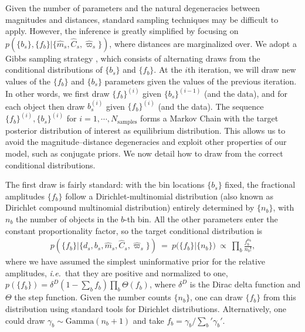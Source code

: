 \documentclass[manuscript, letterpaper]{aastex6}
\newcommand{\ie}{{\textit{i.e.}~}}
\newcommand{\eg}{{\textit{e.g.},~}}
\newcommand{\eqn}[1]{\begin{eqnarray}#1\end{eqnarray}}
\begin{document}
Given the number of parameters and the natural degeneracies between magnitudes and distances, standard sampling techniques may be difficult to apply.
However, the inference is greatly simplified by focusing on $p(\{ b_s \}, \{ f_{b} \} | \{ \hat{m}_s, \hat{C}_s, \hat{\varpi}_s \})$, where distances are marginalized over.
We adopt a Gibbs sampling strategy \citep[see \eg][]{Casella1992, Wandelt2004, Levin2009, brooks2011handbook}, which consists of alternating draws from the conditional distributions of $\{ b_s \}$ and $\{ f_{b} \}$.
At the $i$th iteration, we will draw new values of the $\{ f_{b} \}$ and $\{b_s\}$ parameters given the values of the previous iteration.
In other words, we first draw $\{ f_{b} \}^{(i)}$ given $\{b_s\}^{(i-1)}$ (and the data), and for each object then draw $b_s^{(i)}$ given $\{ f_{b} \}^{(i)}$ (and the data). 
The sequence $\{ f_{b} \}^{(i)},\{b_s\}^{(i)}$ for $i=1, \cdots, N_\mathrm{samples}$ forms a Markov Chain with the target posterior distribution of interest as equilibrium distribution.
This allows us to avoid the magnitude--distance degeneracies and exploit other properties of our model, such as conjugate priors.
We now detail how to draw from the correct conditional distributions.

The first draw is fairly standard: with the bin locations $\{b_s\}$ fixed, the fractional amplitudes $\{ f_{b} \}$ follow a Dirichlet-multinomial distribution (also known as Dirichlet compound multinomial distribution) entirely determined by $\{n_b \}$, with $n_b$ the number of objects in the $b$-th bin.
All the other parameters enter the constant proportionality factor, so the target conditional distribution is
\eqn{
	p\left(\bigl\{ f_b \bigr\} \bigr\rvert \bigl\{ d_s, b_s, \hat{m}_s, \hat{C}_s, \hat{\varpi}_s \bigr\} \right) \ = \ p\bigl( \bigl\{ f_b \bigr\} \bigr\rvert \{n_b \} \bigr) \ \propto\  \prod_b \frac{ f_b^{n_b} }{n_b !},
}
where we have assumed the simplest uninformative prior for the relative amplitudes, \ie that they are positive and normalized to one, $p(\bigl\{ f_b \bigr\}) = \delta^D(1 - \sum_b f_b) \prod_b \Theta(f_b)$, where $\delta^D$ is the Dirac delta function and $\Theta$ the step function.
Given the number counts $\{n_b \}$, one can draw $\{ f_b \}$ from this distribution using standard tools for Dirichlet distributions. 
Alternatively, one could draw $\gamma_b \sim \mathrm{Gamma}(n_b + 1)$ and take $f_b = \gamma_b / \sum_b' \gamma_b'$.
\end{document}

